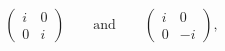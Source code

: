 \begin{equation}
 \begin{pmatrix} i & 0\\ 0 & i\end{pmatrix}\qquad\text{and}\qquad
 \begin{pmatrix} i & 0\\ 0 & -i\end{pmatrix},
\end{equation}

